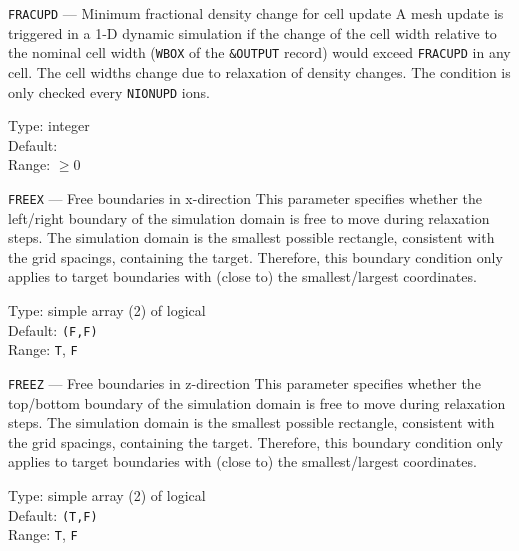 \begin{keydescription}{\texttt{FRACUPD} --- Minimum fractional density
change for cell update}
%
  A mesh update is triggered in a 1-D dynamic simulation if the change of the
  cell width relative to the nominal cell width (\texttt{WBOX} of the
  \texttt{\&OUTPUT} record) would exceed \texttt{FRACUPD} in any cell. The cell
  widths change due to relaxation of density changes. The condition is only
  checked every \texttt{NIONUPD} ions. 
  \begin{keytab}
    Type:    \> integer \\
    Default:  \\
    Range:   \> $\ge 0$
  \end{keytab}
\end{keydescription}

\ifprivate
\begin{keydescription}{\texttt{FREEX} --- Free boundaries in x-direction}
%
  This parameter specifies whether the left/right boundary of the
  simulation domain is free to move during relaxation steps. The simulation
  domain is the smallest possible rectangle, consistent with the grid spacings,
  containing the target. Therefore, this boundary condition only applies to
  target boundaries with (close to) the smallest/largest coordinates.
  \begin{keytab}
    Type:    \> simple array (2) of logical \\
    Default: \> \texttt{(F,F)} \\
    Range:   \> \texttt{T}, \texttt{F} 
  \end{keytab}
\end{keydescription}

\begin{keydescription}{\texttt{FREEZ} --- Free boundaries in z-direction}
%
  This parameter specifies whether the top/bottom boundary of the
  simulation domain is free to move during relaxation steps. The simulation
  domain is the smallest possible rectangle, consistent with the grid spacings,
  containing the target. Therefore, this boundary condition only applies to
  target boundaries with (close to) the smallest/largest coordinates.
  \begin{keytab}
    Type:    \> simple array (2) of logical \\
    Default: \> \texttt{(T,F)} \\
    Range:   \> \texttt{T}, \texttt{F} 
  \end{keytab}
\end{keydescription}
\fi


